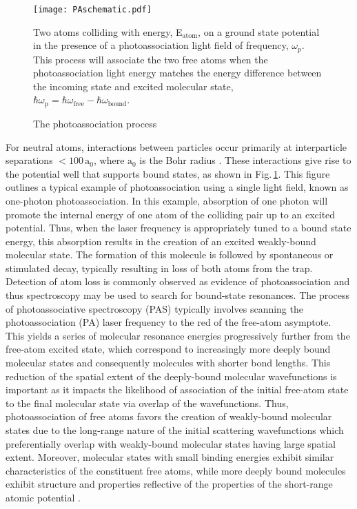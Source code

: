 	\begin{figure} 
		\centerline{
		\texttt{[image: PAschematic.pdf]}}
		\caption{The photoassociation process}{Two atoms colliding with energy, E$_\text{atom}$, on a ground state potential in the presence of a photoassociation light field of frequency, $\omega_p$. This process will associate the two free atoms when the photoassociation light energy matches the energy difference between the incoming state and excited molecular state, $\hbar \omega_\text{p} = \hbar \omega_\text{free} - \hbar \omega_\text{bound}$.}
		\label{fig:1pasSch}
	\end{figure}
For neutral atoms, interactions between particles occur primarily at interparticle separations $<\!100\,\text{a}_0$, where $\text{a}_0$ is the Bohr radius \cite{Chin2010}.
These interactions give rise to the potential well that supports bound states, as shown in Fig.\,\ref{fig:1pasSch}.
This figure outlines a typical example of photoassociation using a single light field, known as one-photon photoassociation.
In this example, absorption of one photon will promote the internal energy of one atom of the colliding pair up to an excited potential.
Thus, when the laser frequency is appropriately tuned to a bound state energy, this absorption results in the creation of an excited weakly-bound molecular state.
The formation of this molecule is followed by spontaneous or stimulated decay, typically resulting in loss of both atoms from the trap.
Detection of atom loss is commonly observed as evidence of photoassociation and thus spectroscopy may be used to search for bound-state resonances.
The process of photoassociative spectroscopy (PAS) typically involves scanning the photoassociation (PA) laser frequency to the red of the free-atom asymptote.
This yields a series of molecular resonance energies progressively further from the free-atom excited state, which correspond to increasingly more deeply bound molecular states and consequently molecules with shorter bond lengths.
This reduction of the spatial extent of the deeply-bound molecular wavefunctions is important as it impacts the likelihood of association of the initial free-atom state to the final molecular state via overlap of the wavefunctions.
Thus, photoassociation of free atoms favors the creation of weakly-bound molecular states due to the long-range nature of the initial scattering wavefunctions which preferentially overlap with weakly-bound molecular states having large spatial extent.
Moreover, molecular states with small binding energies exhibit similar characteristics of the constituent free atoms, while more deeply bound molecules exhibit structure and properties reflective of the properties of the short-range atomic potential \cite{Jones2006}.

